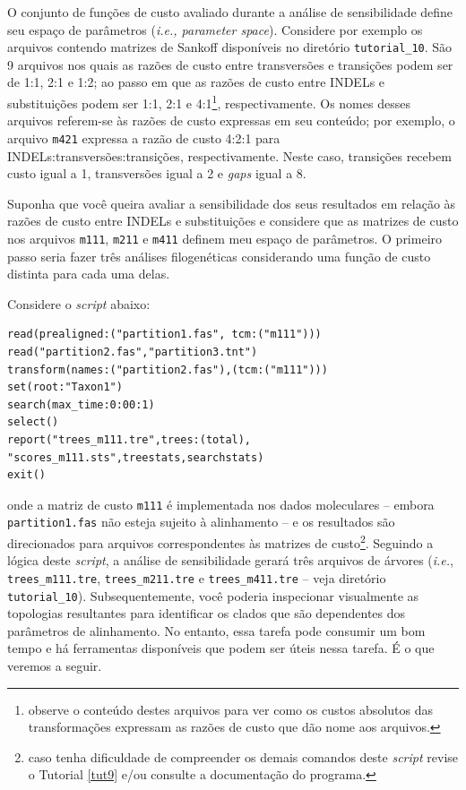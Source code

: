 \begin{refsection}
O conjunto de funções de custo avaliado durante a análise de sensibilidade define seu espaço de parâmetros (\textit{i.e., parameter space}). Considere por exemplo os arquivos contendo matrizes de Sankoff disponíveis no diretório \texttt{tutorial\_10}. São 9 arquivos nos quais as razões de custo entre transversões e transições podem ser de 1:1, 2:1 e 1:2; ao passo em que as razões de custo entre INDELs e substituições podem ser 1:1, 2:1 e 4:1\footnote{ observe o conteúdo destes arquivos para ver como os custos absolutos das transformações expressam as razões de custo que dão nome aos arquivos.}, respectivamente. Os nomes desses arquivos referem-se às razões de custo expressas em seu conteúdo; por exemplo, o arquivo \texttt{m421} expressa a razão de custo 4:2:1 para INDELs:transversões:transições, respectivamente. Neste caso, transições recebem custo igual a 1, transversões igual a 2 e \textit{gaps} igual a 8.

Suponha que você queira avaliar a sensibilidade dos seus resultados em relação às razões de custo entre INDELs e substituições e considere que as matrizes de custo nos arquivos \texttt{m111}, \texttt{m211} e \texttt{m411} definem meu espaço de parâmetros. O primeiro passo seria fazer três análises filogenéticas considerando uma função de custo distinta para cada uma delas. 

	Considere o \textit{script} abaixo:\\

\begin{lstlisting}[caption= Exemplo de \textit{script} para implementar análises de sensibilidade (veja \texttt{tutorial\_10/script2.poy}).,label=tut10:sa:implementation:script1]
read(prealigned:("partition1.fas", tcm:("m111")))
read("partition2.fas","partition3.tnt")
transform(names:("partition2.fas"),(tcm:("m111")))
set(root:"Taxon1")
search(max_time:0:00:1)
select()
report("trees_m111.tre",trees:(total),
"scores_m111.sts",treestats,searchstats)
exit()
\end{lstlisting}

onde a matriz de custo \texttt{m111} é implementada nos dados moleculares -- embora \texttt{partition1.fas} não esteja sujeito à alinhamento -- e os resultados são direcionados para arquivos correspondentes às matrizes de custo\footnote{ caso tenha dificuldade de compreender os demais comandos deste \textit{script} revise o Tutorial \ref{tut9} e/ou consulte a documentação do programa.}. Seguindo a lógica deste \textit{script}, a análise de sensibilidade gerará três arquivos de árvores (\textit{i.e.}, \texttt{trees\_m111.tre}, \texttt{trees\_m211.tre} e \texttt{trees\_m411.tre} -- veja diretório \texttt{tutorial\_10}). Subsequentemente, você poderia inspecionar visualmente as topologias resultantes para identificar os clados que são dependentes dos parâmetros de alinhamento. No entanto, essa tarefa pode consumir um bom tempo e há ferramentas disponíveis que podem ser úteis nessa tarefa. É o que veremos a seguir.


\end{refsection}
